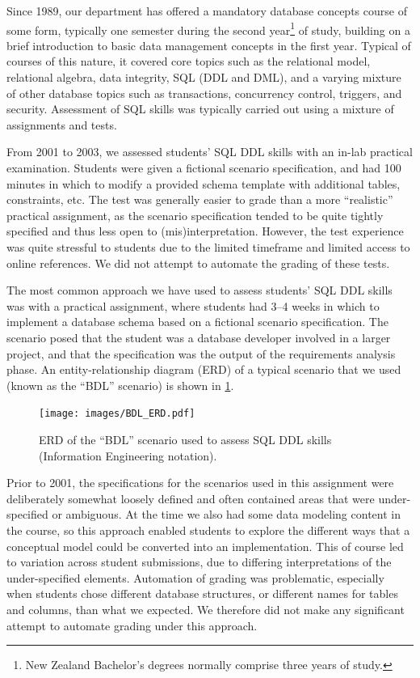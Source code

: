 \documentclass[sigconf, authordraft, capitalise]{acmart}
\begin{document}
Since 1989, our department has offered a mandatory database concepts course of some form, typically one semester during the second year\footnote{New Zealand Bachelor's degrees normally comprise three years of study.} of study, building on a brief introduction to basic data management concepts in the first year. Typical of courses of this nature, it covered core topics such as the relational model, relational algebra, data integrity, SQL (DDL and DML), and a varying mixture of other database topics such as transactions, concurrency control, triggers, and security. Assessment of SQL skills was typically carried out using a mixture of assignments and tests.

From 2001 to 2003, we assessed students' SQL DDL skills with an in-lab practical examination. Students were given a fictional scenario specification, and had 100 minutes in which to modify a provided schema template with additional tables, constraints, etc. The test was generally easier to grade than a more ``realistic'' practical assignment, as the scenario specification tended to be quite tightly specified and thus less open to (mis)interpretation. However, the test experience was quite stressful to students due to the limited timeframe and limited access to online references. We did not attempt to automate the grading of these tests.

The most common approach we have used to assess students' SQL DDL skills was with a practical assignment, where students had 3--4 weeks in which to implement a database schema based on a fictional scenario specification. The scenario posed that the student was a database developer involved in a larger project, and that the specification was the output of the requirements analysis phase. An entity-relationship diagram (ERD) of a typical scenario that we used (known as the ``BDL'' scenario) is shown in \cref{fig-ERD}.
 
 
\begin{figure}[hb]
    \centering
    \texttt{[image: images/BDL\_ERD.pdf]} 
    \caption{ERD of the ``BDL'' scenario used to assess SQL DDL skills (Information Engineering notation).}
    \label{fig-ERD}
\end{figure}


Prior to 2001, the specifications for the scenarios used in this assignment were deliberately somewhat loosely defined and often contained areas that were under-specified or ambiguous. At the time we also had some data modeling content in the course, so this approach enabled students to explore the different ways that a conceptual model could be converted into an implementation. This of course led to variation across student submissions, due to differing interpretations of the under-specified elements. Automation of grading was problematic, especially when students chose different database structures, or different names for tables and columns, than what we expected. We therefore did not make any significant attempt to automate grading under this approach.
\end{document}
